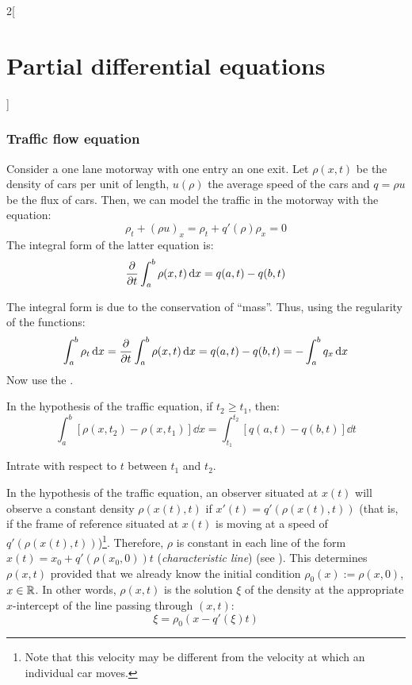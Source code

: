 \documentclass[../../../main_math.tex]{subfiles}
\begin{document}
\begin{multicols}{2}[\section{Partial differential equations}]
  \subsubsection{Traffic flow equation}
  \begin{proposition}
    Consider a one lane motorway with one entry an one exit. Let $\rho(x,t)$ be the density of cars per unit of length, $u(\rho)$ the average speed of the cars and $q=\rho u$ be the flux of cars. Then, we can model the traffic in the motorway with the equation: $$\rho_t+{(\rho u)}_x=\rho_t+q'(\rho){\rho}_x=0$$
    The integral form of the latter equation is:
    \begin{equation}\label{PDE:trafficintegral}
      \pdv{}{t}\int_{a}^b\rho(x,t)\dd{x}=q(a,t)-q(b,t)
    \end{equation}
  \end{proposition}
  \begin{sproof}
    The integral form is due to the conservation of ``mass''. Thus, using the regularity of the functions:
    $$\int_a^b\rho_t\dd{x}=\pdv{}{t}\int_{a}^b\rho(x,t)\dd{x}=q(a,t)-q(b,t)=-\int_a^bq_x\dd{x}$$
    Now use the .
  \end{sproof}
  \begin{proposition}
    In the hypothesis of the traffic equation, if $t_2\geq t_1$, then:
    \begin{equation}\label{PDE:trafficintegral2}
      \int_{a}^b[\rho(x,t_2)-\rho(x,t_1)]\dd{x}=\int_{t_1}^{t_2}[q(a,t)-q(b,t)]\dd{t}
    \end{equation}
  \end{proposition}
  \begin{sproof}
    Intrate  with respect to $t$ between $t_1$ and $t_2$.
  \end{sproof}
  \begin{proposition}
    In the hypothesis of the traffic equation, an observer situated at $x(t)$ will observe a constant density $\rho(x(t),t)$ if $x'(t)=q'(\rho(x(t),t))$ (that is, if the frame of reference situated at $x(t)$ is moving at a speed of $q'(\rho(x(t),t))$)\footnote{Note that this
      velocity may be different from the velocity at which an individual car moves.}. Therefore, $\rho$ is constant in each line of the form $x(t)=x_0+q'(\rho(x_0,0))t$ (\emph{characteristic line}) (see ). This determines $\rho(x,t)$ provided that we already know the initial condition $\rho_0(x):=\rho(x,0)$, $x\in\mathbb{R}$. In other words, $\rho(x,t)$ is the solution $\xi$ of the density at the appropriate $x$-intercept of the line passing through $(x,t)$: $$\xi=\rho_0(x-q'(\xi)t)$$

\end{proposition}
\end{multicols}
\end{document}
